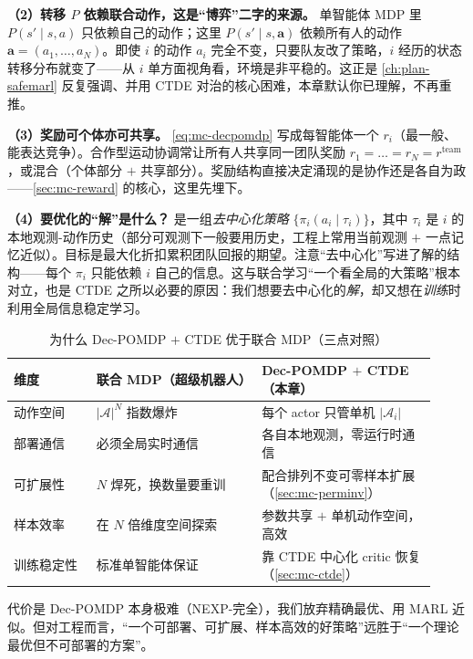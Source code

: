 \textbf{（2）转移 $P$ 依赖联合动作，这是“博弈”二字的来源。} 单智能体 MDP 里 $P(s'\mid s,a)$ 只依赖自己的动作；这里 $P(s'\mid s,\mathbf{a})$ 依赖所有人的动作 $\mathbf{a}=(a_1,\dots,a_N)$。即使 $i$ 的动作 $a_i$ 完全不变，只要队友改了策略，$i$ 经历的状态转移分布就变了——从 $i$ 单方面视角看，环境是非平稳的。这正是 \cref{ch:plan-safemarl} 反复强调、并用 CTDE 对治的核心困难，本章默认你已理解，不再重推。

\textbf{（3）奖励可个体亦可共享。} \cref{eq:mc-decpomdp} 写成每智能体一个 $r_i$（最一般、能表达竞争）。合作型运动协调常让所有人共享同一团队奖励 $r_1=\dots=r_N=r^{\text{team}}$，或混合（个体部分 $+$ 共享部分）。奖励结构直接决定涌现的是协作还是各自为政——\cref{sec:mc-reward} 的核心，这里先埋下。

\textbf{（4）要优化的“解”是什么？} 是一组\emph{去中心化策略} $\{\pi_i(a_i\mid\tau_i)\}$，其中 $\tau_i$ 是 $i$ 的本地观测-动作历史（部分可观测下一般要用历史，工程上常用当前观测 $+$ 一点记忆近似）。目标是最大化折扣累积团队回报的期望。注意“去中心化”写进了解的结构——每个 $\pi_i$ 只能依赖 $i$ 自己的信息。这与联合学习“一个看全局的大策略”根本对立，也是 CTDE 之所以必要的原因：我们想要去中心化的\emph{解}，却又想在\emph{训练}时利用全局信息稳定学习。

\begin{table}[H]\centering\small
\caption{为什么 Dec-POMDP $+$ CTDE 优于联合 MDP（三点对照）}
\label{tab:mc-vs-joint}
\begin{tabular}{p{0.18\linewidth}p{0.36\linewidth}p{0.38\linewidth}}
\toprule
维度 & 联合 MDP（超级机器人） & Dec-POMDP $+$ CTDE（本章） \\
\midrule
动作空间 & $|\mathcal{A}|^N$ 指数爆炸 & 每个 actor 只管单机 $|\mathcal{A}_i|$ \\
部署通信 & 必须全局实时通信 & 各自本地观测，零运行时通信 \\
可扩展性 & $N$ 焊死，换数量要重训 & 配合排列不变可零样本扩展（\cref{sec:mc-perminv}） \\
样本效率 & 在 $N$ 倍维度空间探索 & 参数共享 $+$ 单机动作空间，高效 \\
训练稳定性 & 标准单智能体保证 & 靠 CTDE 中心化 critic 恢复（\cref{sec:mc-ctde}） \\
\bottomrule
\end{tabular}
\end{table}

\noindent 代价是 Dec-POMDP 本身极难（NEXP-完全），我们放弃精确最优、用 MARL 近似。但对工程而言，“一个可部署、可扩展、样本高效的好策略”远胜于“一个理论最优但不可部署的方案”。

